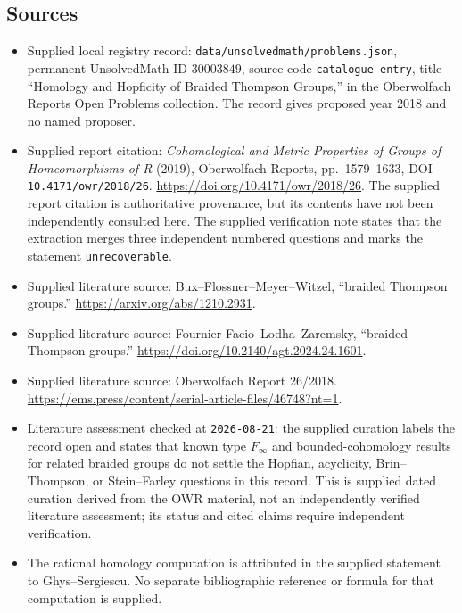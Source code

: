 \documentclass[11pt]{article}
\begin{document}
\subsection{Sources}
\begin{itemize}
\item Supplied local registry record: \texttt{data/unsolvedmath/problems.json}, permanent UnsolvedMath ID \(30003849\), source code \texttt{catalogue entry}, title ``Homology and Hopficity of Braided Thompson Groups,'' in the Oberwolfach Reports Open Problems collection. The record gives proposed year 2018 and no named proposer.
\item Supplied report citation: \emph{Cohomological and Metric Properties of Groups of Homeomorphisms of R} (2019), Oberwolfach Reports, pp.\ 1579--1633, DOI \texttt{10.4171/owr/2018/26}. \url{https://doi.org/10.4171/owr/2018/26}. The supplied report citation is authoritative provenance, but its contents have not been independently consulted here. The supplied verification note states that the extraction merges three independent numbered questions and marks the statement \texttt{unrecoverable}.
\item Supplied literature source: Bux--Flossner--Meyer--Witzel, ``braided Thompson groups.'' \url{https://arxiv.org/abs/1210.2931}.
\item Supplied literature source: Fournier-Facio--Lodha--Zaremsky, ``braided Thompson groups.'' \url{https://doi.org/10.2140/agt.2024.24.1601}.
\item Supplied literature source: Oberwolfach Report 26/2018. \url{https://ems.press/content/serial-article-files/46748?nt=1}.
\item Literature assessment checked at \texttt{2026-08-21}: the supplied curation labels the record open and states that known type \(F_\infty\) and bounded-cohomology results for related braided groups do not settle the Hopfian, acyclicity, Brin--Thompson, or Stein--Farley questions in this record. This is supplied dated curation derived from the OWR material, not an independently verified literature assessment; its status and cited claims require independent verification.
\item The rational homology computation is attributed in the supplied statement to Ghys--Sergiescu. No separate bibliographic reference or formula for that computation is supplied.
\end{itemize}
\end{document}
